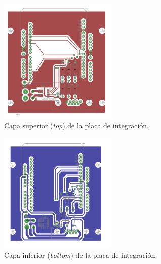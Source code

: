 \begin{figure}[ht]
  \centering
  \includegraphics[width=0.5\textwidth]{img/anexo/top_layer}
  \caption{Capa superior (\textit{top}) de la placa de integración.}
  \label{cap4_scorbot_firmware}
\end{figure}


\begin{figure}[ht]
  \centering
  \includegraphics[width=0.5\textwidth]{img/anexo/bottom_layer}
  \caption{Capa inferior (\textit{bottom}) de la placa de integración.}
  \label{cap4_scorbot_firmware}
\end{figure}

